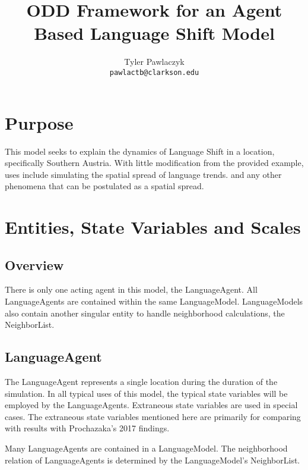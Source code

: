 \documentclass{article}
\title{ODD Framework for an Agent Based  Language Shift Model}
\author{Tyler Pawlaczyk \\ \texttt{pawlactb@clarkson.edu}}
\begin{document}
\maketitle

\tableofcontents

\pagebreak

\section{Purpose}
This model seeks to explain the dynamics of Language Shift in a location, specifically Southern Austria. With little modification from the provided example, uses include simulating the spatial spread of language trends.  and any other phenomena that can be postulated as a spatial spread.

\section{Entities, State Variables and Scales}
\subsection{Overview}
There is only one acting agent in this model, the LanguageAgent. All LanguageAgents are contained within the same LanguageModel. LanguageModels also contain another singular entity to handle neighborhood calculations, the NeighborList.

\subsection{LanguageAgent}

The LanguageAgent represents a single location during the duration of the simulation. In all typical uses of this model, the typical state variables will be employed by the LanguageAgents. Extraneous state variables are used in special cases. The extraneous state variables mentioned here are primarily for comparing with results with Prochazaka's 2017 findings.

Many LanguageAgents are contained in a LanguageModel. The neighborhood relation of LanguageAgents is determined by the LanguageModel's NeighborList.
\end{document}
